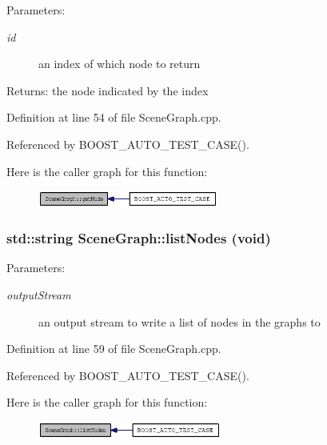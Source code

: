 \begin{Desc}
\item[Parameters:]
\begin{description}
\item[{\em id}]an index of which node to return \end{description}
\end{Desc}


\begin{Desc}
\item[Returns:]the node indicated by the index \end{Desc}


Definition at line 54 of file SceneGraph.cpp.

Referenced by BOOST\_\-AUTO\_\-TEST\_\-CASE().

Here is the caller graph for this function:\nopagebreak
\begin{figure}[H]
\begin{center}
\leavevmode
\includegraphics[width=168pt]{classSceneGraph_3d8dfec1bb4e175f87c0d44462140244_icgraph}
\end{center}
\end{figure}
\subsubsection{\setlength{\rightskip}{0pt plus 5cm}std::string SceneGraph::listNodes (void)}\label{classSceneGraph_86ebfcf900443c1b28f9c2a2c2fc8ea8}


\begin{Desc}
\item[Parameters:]
\begin{description}
\item[{\em outputStream}]an output stream to write a list of nodes in the graphs to \end{description}
\end{Desc}




Definition at line 59 of file SceneGraph.cpp.

Referenced by BOOST\_\-AUTO\_\-TEST\_\-CASE().

Here is the caller graph for this function:\nopagebreak
\begin{figure}[H]
\begin{center}
\leavevmode
\includegraphics[width=171pt]{classSceneGraph_86ebfcf900443c1b28f9c2a2c2fc8ea8_icgraph}
\end{center}
\end{figure}
